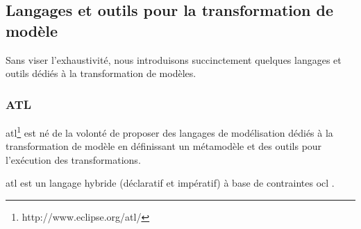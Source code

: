 	\subsection{Langages et outils pour la transformation de modèle}
Sans viser l'exhaustivité, nous introduisons succinctement quelques langages et outils 
dédiés à la transformation de modèles.  

\subsubsection{ATL}
\label{sec:ATL}
\gls{atl}\footnote{http://www.eclipse.org/atl/} est né de la volonté de proposer des langages de modélisation dédiés à la transformation de modèle en définissant un métamodèle 
et des outils pour l'exécution des transformations. 

\gls{atl} est un langage hybride (déclaratif et impératif) à base de contraintes \gls{ocl} \cite{jouault2006transforming}. 

%


